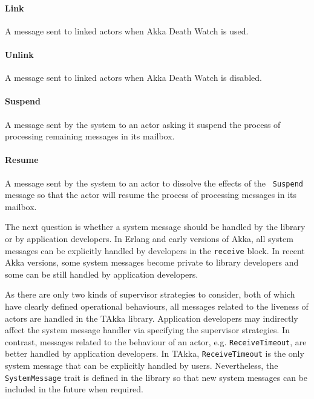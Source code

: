 \paragraph{Link} A message sent to linked actors when Akka Death Watch \citep[Section 
3.1]{akka_doc} is used.

\paragraph{Unlink}  A message sent to linked actors when Akka Death Watch \citep[Section 
3.1]{akka_doc} is disabled. 

\paragraph{Suspend}   A message sent by the system to an actor asking it suspend the process of 
processing remaining messages in its mailbox.

\paragraph{Resume}  A message sent by the system to an actor to dissolve the effects of the {\tt 
Suspend} message so that the actor will resume the process of processing 
messages in its mailbox.





The next question is whether a system message should be handled by the library 
or by application developers.  In Erlang and early versions of Akka, all
system messages can be explicitly handled by developers in the {\tt receive}
block.  In recent Akka versions, some system messages become private to library 
developers and some can be still handled by application developers.

As there are only two kinds of supervisor strategies to
consider, both of which have clearly defined operational behaviours, all
messages related to the liveness of actors are handled in the TAkka library. 
Application developers may indirectly affect the system message handler via 
specifying
the supervisor strategies. In contrast, messages related to the behaviour of an
actor, e.g. {\tt ReceiveTimeout}, are better handled by application
developers. In TAkka, {\tt ReceiveTimeout} is the only system message that can
be explicitly handled by users.  Nevertheless, the {\tt SystemMessage}
trait is defined in the library so that new system messages can be included in 
the future when required.


